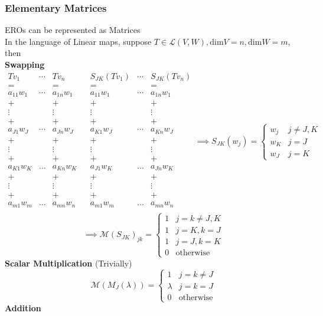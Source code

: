 \documentclass{article}
\newcommand{\0}{{\bf{0}}}
\begin{document}
\subsubsection{Elementary Matrices}
EROs can be represented as Matrices\\
In the language of Linear maps, suppose $T\in\mathcal{L}(V,W),\mbox{dim}V=n,\mbox{dim}W=m$, then\\
\textbf{Swapping}
$$\begin{matrix}
    Tv_1&\cdots&Tv_n&&S_{JK}(Tv_1)&\cdots&S_{JK}(Tv_n)\\
    =&&=&&=&&=\\
    a_{11}w_1&\cdots&a_{1n}w_1&&a_{11}w_1&\cdots&a_{1n}w_1\\
    +&&+&&+&&+\\
    \vdots&&\vdots&&\vdots&&\vdots\\
    +&&+&&+&&+\\
    a_{J1}w_J&\cdots&a_{Jn}w_J&&a_{K1}w_J&\cdots&a_{Kn}w_J\\
    +&&+&&+&&+\\
    \vdots&&\vdots&&\vdots&&\vdots\\
    +&&+&&+&&+\\
    a_{K1}w_K&\dots&a_{Kn}w_K&&a_{J1}w_K&\dots&a_{Jn}w_K\\
    +&&+&&+&&+\\
    \vdots&&\vdots&&\vdots&&\vdots\\
    +&&+&&+&&+\\
    a_{m1}w_m&\dots&a_{mn}w_n&&a_{m1}w_m&\dots&a_{mn}w_n\\
\end{matrix}\implies S_{JK}(w_j)=\begin{cases}
    w_j&j\neq J,K\\
    w_K&j=J\\
    w_J&j=K
\end{cases}$$
$$\implies\mathcal{M}(S_{JK})_{jk}=\begin{cases}
    1&j=k\neq J,K\\
    1&j=K,k=J\\
    1&j=J,k=K\\
    0&\mbox{otherwise}
\end{cases}$$
\textbf{Scalar Multiplication} (Trivially)
$$\mathcal{M}(M_J(\lambda))=\begin{cases}
    1&j=k\neq J\\
    \lambda&j=k=J\\
    0&\mbox{otherwise}
\end{cases}$$
\textbf{Addition}
\end{document}
